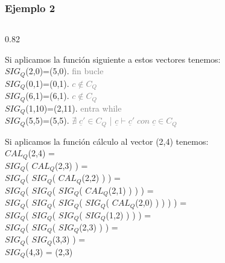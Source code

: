 \documentclass[xcolor=table]{beamer}
\begin{document}
\begin{frame}[fragile]\frametitle{Ejemplo 2} \footnotesize  

\begin{columns}


    \begin{column}{0.82\textwidth}

        Si aplicamos la función siguiente a estos vectores tenemos:\\
        \hspace{0.5cm}          $SIG_Q$(2,0)=(5,0).   \textcolor{gray}{fin bucle}\\
        \hspace{0.5cm}          $SIG_Q$(0,1)=(0,1).   \textcolor{gray}{$c\notin C_Q$}\\
        \hspace{0.5cm}          $SIG_Q$(6,1)=(6,1).   \textcolor{gray}{$c\notin C_Q$}\\
        \hspace{0.5cm}          $SIG_Q$(1,10)=(2,11). \textcolor{gray}{entra while} \\
        \hspace{0.5cm}          $SIG_Q$(5,5)=(5,5).   \textcolor{gray}{$\nexists\; \underline{c}' \in C_Q$ | $\underline{c}  \vdash  \underline{c}'\; con\;  \underline{c} \in C_Q$ } \\  
  \vspace{0.2cm}
  
   Si aplicamos la función cálculo al vector (2,4) tenemos:\\ \scriptsize
        \hspace{0.5cm}          $CAL_Q$(2,4) =\\
        \hspace{0.5cm}          $SIG_Q$( $CAL_Q$(2,3) ) =\\
        \hspace{0.5cm}          $SIG_Q$( $SIG_Q$( $CAL_Q$(2,2) ) ) =\\
        \hspace{0.5cm}          $SIG_Q$( $SIG_Q$( $SIG_Q$( $CAL_Q$(2,1) ) ) ) =\\
        \hspace{0.5cm}          $SIG_Q$( $SIG_Q$( $SIG_Q$( $SIG_Q$( $CAL_Q$(2,0) ) ) ) ) =\\
        \hspace{0.5cm}          $SIG_Q$( $SIG_Q$( $SIG_Q$( $SIG_Q$(1,2) ) ) ) =\\
        \hspace{0.5cm}          $SIG_Q$( $SIG_Q$( $SIG_Q$(2,3) ) ) =\\
        \hspace{0.5cm}          $SIG_Q$( $SIG_Q$(3,3) ) =\\
        \hspace{0.5cm}          $SIG_Q$(4,3) = (2,3)\\
      

\end{column}
\end{columns}
\end{frame}
\end{document}
